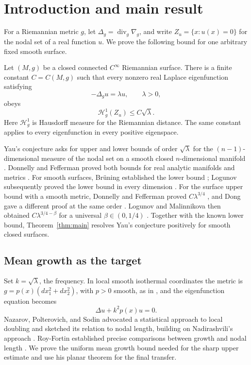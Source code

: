 \section{Introduction and main result}\label{sec:introduction}

For a Riemannian metric $g$, let $\Delta_g=\operatorname{div}_g\nabla_g$,
and write $Z_u=\{x:u(x)=0\}$ for the nodal set of a real function $u$.
We prove the following bound for one arbitrary fixed smooth surface.

\begin{theorem}\label{thm:main}
Let $(M,g)$ be a closed connected $C^\infty$ Riemannian surface.
There is a finite constant $C=C(M,g)$ such that every nonzero real
Laplace eigenfunction satisfying
\[
 -\Delta_g u=\lambda u,\qquad \lambda>0,
\]
obeys
\[
 \mathcal H_g^1(Z_u)\le C\sqrt\lambda.
\]
Here $\mathcal H_g^1$ is Hausdorff measure for the Riemannian distance.
The same constant applies to every eigenfunction in every positive
eigenspace.
\end{theorem}

Yau's conjecture asks for upper and lower bounds of order
$\sqrt\lambda$ for the $(n-1)$-dimensional measure of the nodal set
on a smooth closed $n$-dimensional manifold \cite{Yau1982}.
Donnelly and Fefferman proved both bounds for real analytic manifolds
and metrics \cite[Theorem~1.2]{DonnellyFefferman1988}.
For smooth surfaces, Br\"uning established the lower bound
\cite[Satz~2]{Bruning1978}; Logunov subsequently proved the lower bound
in every dimension \cite[Theorem~1.1]{Logunov2018Lower}.
For the surface upper bound with a smooth metric, Donnelly and
Fefferman proved $C\lambda^{3/4}$ \cite{DonnellyFefferman1990},
and Dong gave a different proof at the same order \cite{Dong1992}.
Logunov and Malinnikova then obtained
$C\lambda^{3/4-\beta}$ for a universal $\beta\in(0,1/4)$
\cite[Equation~(1.1)]{LogunovMalinnikova2018}.
Together with the known lower bound, Theorem~\ref{thm:main}
resolves Yau's conjecture positively for smooth closed surfaces.

\subsection*{Mean growth as the target}

Set $k=\sqrt\lambda$, the frequency. In local smooth isothermal
coordinates the metric is $g=p(x)(dx_1^2+dx_2^2)$, with $p>0$ smooth,
as in \cite[Section~1]{DeTurckKazdan1981}, and the eigenfunction
equation becomes
\[
 \Delta u+k^2p(x)u=0.
\]
Nazarov, Polterovich, and Sodin advocated a statistical approach to
local doubling and sketched its relation to nodal length, building on
Nadirashvili's approach
\cite[Section~7.3]{NazarovPolterovichSodin2005}.
Roy-Fortin established precise comparisons between growth and nodal
length \cite{RoyFortin2015,RoyFortinLq}. We prove the uniform mean
growth bound needed for the sharp upper estimate and use his planar
theorem for the final transfer.

